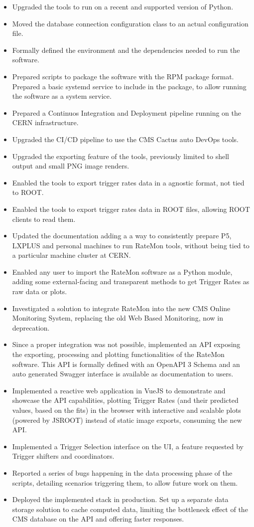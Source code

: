 \documentclass[a4, oneside, 10pt, nobib]{memoir}
\begin{document}
		\begin{itemize}

		\item Upgraded the tools to run on a recent and supported version of Python.
		\item Moved the database connection configuration class to an actual configuration file.
		\item Formally defined the environment and the dependencies needed to run the software.
		\item Prepared scripts to package the software with the RPM package format. Prepared a basic systemd service to include in the package, to allow running the software as a system service.
		\item Prepared a Continuos Integration and Deployment pipeline running on the CERN infrastructure.
		\item Upgraded the CI/CD pipeline to use the CMS Cactus auto DevOps tools.
		\item Upgraded the exporting feature of the tools, previously limited to shell output and small PNG image renders.
		\item Enabled the tools to export trigger rates data in a agnostic format, not tied to ROOT.
		\item Enabled the tools to export trigger rates data in ROOT files, allowing ROOT clients to read them.
		\item Updated the documentation adding a a way to consistently prepare P5, LXPLUS and personal machines to run RateMon tools, without being tied to a particular machine cluster at CERN.
		\item Enabled any user to import the RateMon software as a Python module, adding some external-facing and transparent methods to get Trigger Rates as raw data or plots.
		\item Investigated a solution to integrate RateMon into the new CMS Online Monitoring System, replacing the old Web Based Monitoring, now in deprecation.
		\item Since a proper integration was not possible, implemented an API exposing the exporting, processing and plotting functionalities of the RateMon software. This API is formally defined with an OpenAPI 3 Schema and an auto generated Swagger interface is available as documentation to users.
		\item Implemented a reactive web application in VueJS to demonstrate and showcase the API capabilities, plotting Trigger Rates (and their predicted values, based on the fits) in the browser with interactive and scalable plots (powered by JSROOT) instead of static image exports, consuming the new API.
		\item Implemented a Trigger Selection interface on the UI, a feature requested by Trigger shifters and coordinators.
		\item Reported a series of bugs happening in the data processing phase of the scripts, detailing scenarios triggering them, to allow future work on them.
		\item Deployed the implemented stack in production. Set up a separate data storage solution to cache computed data, limiting the bottleneck effect of the CMS database on the API and offering faster responses.


\end{itemize}
\end{document}
